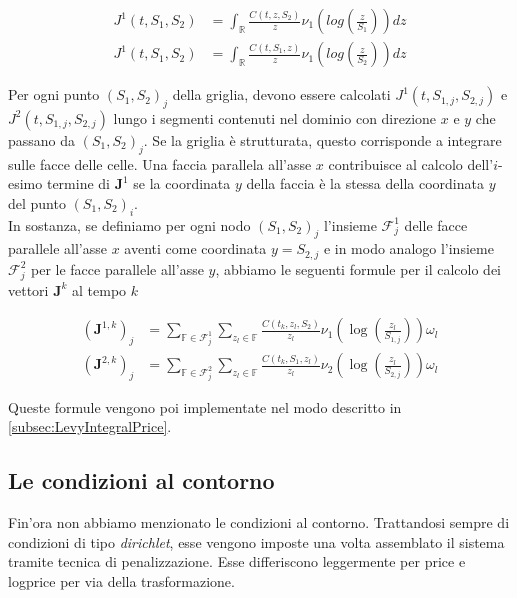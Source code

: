 \documentclass[a4paper,10pt]{report}
\theoremstyle{plain}
\theoremstyle{definition}
\theoremstyle{remark}
\begin{document}
\begin{align*}
 J^1(t,S_1,S_2)&= \int_\mathbb{R} \frac{C(t,z,S_2)}{z}\nu_1\left(log\left(\frac{z}{S_1}\right)\right)dz \\
 J^1(t,S_1,S_2)&= \int_\mathbb{R} \frac{C(t,S_1,z)}{z}\nu_1\left(log\left(\frac{z}{S_2}\right)\right)dz
\end{align*}

Per ogni punto $(S_1,S_2)_j$ della griglia, devono essere calcolati $J^1(t,S_{1,j},S_{2,j})$ e $J^2(t,S_{1,j},S_{2,j})$ lungo i segmenti contenuti nel dominio con direzione $x$ e $y$ che passano da $(S_1,S_2)_j$. Se la griglia è strutturata, questo corrisponde a integrare sulle facce delle celle. Una faccia parallela all'asse $x$ contribuisce al calcolo dell'$i$-esimo termine di $\mathbf{J}^1$ se la coordinata $y$ della faccia è la stessa della coordinata $y$ del punto $(S_1,S_2)_i$.\\
In sostanza, se definiamo per ogni nodo $(S_1,S_2)_j$ l'insieme $\mathcal{F}^1_j$ delle facce parallele all'asse $x$ aventi come coordinata $y=S_{2,j}$ e in modo analogo l'insieme $\mathcal{F}^2_j$ per le facce parallele all'asse $y$, abbiamo le seguenti formule per il calcolo dei vettori $\mathbf{J}^k$ al tempo $k$

\begin{align*}
 (\mathbf{J}^{1,k})_j&=\sum\limits_{\mathbb{F}\in \mathcal{F}^1_j} \sum\limits_{z_l \in \mathbb{F}}\frac{C(t_k,z_l,S_2)}{z_l}\nu_1\left(\log\left(\frac{z_l}{S_{1,j}}\right)\right)\omega_l\\
 (\mathbf{J}^{2,k})_j&=\sum\limits_{\mathbb{F}\in \mathcal{F}^2_j} \sum\limits_{z_l \in \mathbb{F}}\frac{C(t_k,S_1,z_l)}{z_l}\nu_2\left(\log\left(\frac{z_l}{S_{2,j}}\right)\right)\omega_l
\end{align*}

Queste formule vengono poi implementate nel modo descritto in \ref{subsec:LevyIntegralPrice}.

\subsection{Le condizioni al contorno}
Fin'ora non abbiamo menzionato le condizioni al contorno. Trattandosi sempre di condizioni di tipo \emph{dirichlet}, esse vengono imposte una volta assemblato il sistema tramite tecnica di penalizzazione. Esse differiscono leggermente per price e logprice per via della trasformazione.


\end{document}
